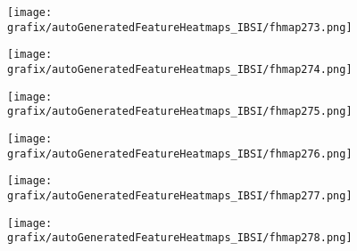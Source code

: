 \hspace{\hsp} 
\begin{subfigure}{\wid\textwidth} 
    \centering 
    \caption{\tiny \sffamily {}} 
    \vspace{\vsp} 
    \texttt{[image: grafix/autoGeneratedFeatureHeatmaps\_IBSI/fhmap273.png]} 
\end{subfigure} 
\hspace{\hsp} 
\begin{subfigure}{\wid\textwidth} 
    \centering 
    \caption{\tiny \sffamily {}} 
    \vspace{\vsp} 
    \texttt{[image: grafix/autoGeneratedFeatureHeatmaps\_IBSI/fhmap274.png]} 
\end{subfigure} 
\hspace{\hsp} 
\begin{subfigure}{\wid\textwidth} 
    \centering 
    \caption{\tiny \sffamily {}} 
    \vspace{\vsp} 
    \texttt{[image: grafix/autoGeneratedFeatureHeatmaps\_IBSI/fhmap275.png]} 
\end{subfigure} 
\hspace{\hsp} 
\begin{subfigure}{\wid\textwidth} 
    \centering 
    \caption{\tiny \sffamily {}} 
    \vspace{\vsp} 
    \texttt{[image: grafix/autoGeneratedFeatureHeatmaps\_IBSI/fhmap276.png]} 
\end{subfigure} 
\hspace{\hsp} 
\begin{subfigure}{\wid\textwidth} 
    \centering 
    \caption{\tiny \sffamily {}} 
    \vspace{\vsp} 
    \texttt{[image: grafix/autoGeneratedFeatureHeatmaps\_IBSI/fhmap277.png]} 
\end{subfigure} 
\hspace{\hsp} 
\begin{subfigure}{\wid\textwidth} 
    \centering 
    \caption{\tiny \sffamily {}} 
    \vspace{\vsp} 
    \texttt{[image: grafix/autoGeneratedFeatureHeatmaps\_IBSI/fhmap278.png]} 
\end{subfigure} 
\hspace{\hsp} 
